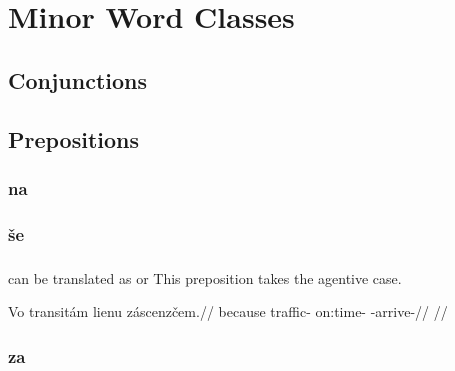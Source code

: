\chapter{Minor Word Classes}

\section{Conjunctions}

\section{Prepositions}

\subsection{na}

\subsection{\v{s}e}

\subsection{}

 can be translated as  or  This preposition takes the agentive case.

\pex
\begingl
\gla Vo transit\'am lienu z\'ascenz\v{c}em.//
\glb because traffic- on:time- -arrive-//
\glft {}//
\endgl
\xe

\subsection{za}
